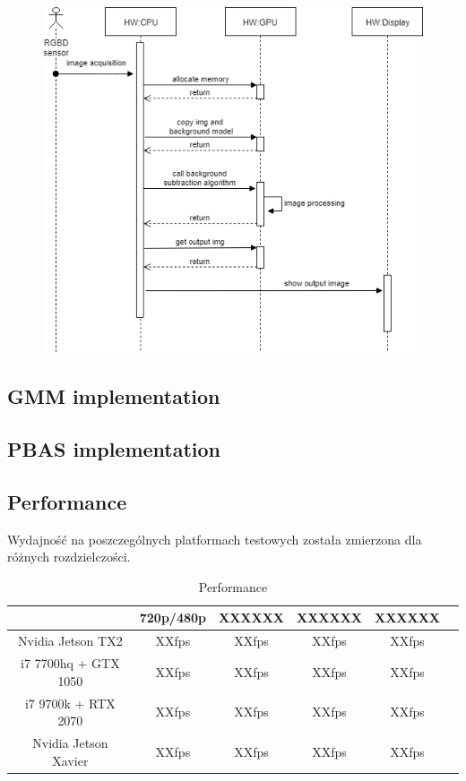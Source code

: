 \documentclass[b5paper,10pt,twoside]{article}
\begin{document}
{\begin{figure}[!t]
	\begin{center}
		\includegraphics[scale=0.50]{img/gpu_bs_alg.png}
		\caption{}
		\label{fig:gpu_alg}
	\end{center}
\end{figure}

\subsection{GMM implementation}
\label{subsec:gmm_implementation}


\subsection{PBAS implementation}
\label{subsec:pbas_implementation}


\subsection{Performance}
\label{subsec:performance}

Wydajność na poszczególnych platformach testowych została zmierzona dla różnych rozdzielczości.%

\begin{table}[t!]
\caption{Performance}
\centering
\begin{tabular}{|c|c|c|c|c|c|}
\hline
&     720p/480p  & XXXXXX & XXXXXX & XXXXXX \\ \hline
Nvidia Jetson TX2  & XXfps & XXfps & XXfps & XXfps  \\ \hline
i7 7700hq + GTX 1050   & XXfps & XXfps & XXfps & XXfps     \\ \hline
i7 9700k + RTX 2070 & XXfps & XXfps &  XXfps & XXfps    \\ \hline
Nvidia Jetson Xavier  & XXfps    & XXfps    & XXfps & XXfps     \\ \hline
\end{tabular}
\label{tab:performance_res}
\end{table}

}
\end{document}
